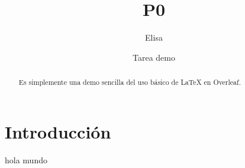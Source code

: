 \documentclass{article}
\title{P0}
\author{Elisa}
\date{Tarea demo}
\begin{document}
\maketitle

\begin{abstract} %
  Es simplemente una demo sencilla del uso b\'{a}sico de \LaTeX{} en
  Overleaf.
\end{abstract}

\section{Introducción}

hola mundo
\end{document}
